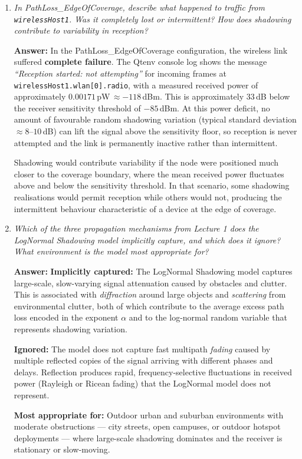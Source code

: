 \documentclass[12pt]{article}
\begin{document}
\begin{enumerate}
    \item \textit{In PathLoss\_EdgeOfCoverage, describe what happened to traffic
          from \texttt{wirelessHost1}. Was it completely lost or intermittent? How
          does shadowing contribute to variability in reception?}

    \textbf{Answer:}
    In the PathLoss\_EdgeOfCoverage configuration, the wireless link suffered
    \textbf{complete failure}. The Qtenv console log shows the message
    \textit{``Reception started: not attempting''} for incoming frames at
    \texttt{wirelessHost1.wlan[0].radio}, with a measured received power of
    approximately $0.00171$\,pW\,$\approx -118$\,dBm. This is approximately
    33\,dB below the receiver sensitivity threshold of $-85$\,dBm. At this
    power deficit, no amount of favourable random shadowing variation (typical
    standard deviation $\approx 8$--$10$\,dB) can lift the signal above the
    sensitivity floor, so reception is never attempted and the link is
    permanently inactive rather than intermittent.

    Shadowing would contribute variability if the node were positioned much
    closer to the coverage boundary, where the mean received power fluctuates
    above and below the sensitivity threshold. In that scenario, some
    shadowing realisations would permit reception while others would not,
    producing the intermittent behaviour characteristic of a device at the
    edge of coverage.

    \item \textit{Which of the three propagation mechanisms from Lecture 1 does
          the LogNormal Shadowing model implicitly capture, and which does it
          ignore? What environment is the model most appropriate for?}

    \textbf{Answer:}
    \textbf{Implicitly captured:} The LogNormal Shadowing model captures
    large-scale, slow-varying signal attenuation caused by obstacles and clutter.
    This is associated with \textit{diffraction} around large objects and
    \textit{scattering} from environmental clutter, both of which contribute to
    the average excess path loss encoded in the exponent $\alpha$ and to the
    log-normal random variable that represents shadowing variation.

    \textbf{Ignored:} The model does not capture fast multipath \textit{fading}
    caused by multiple reflected copies of the signal arriving with different
    phases and delays. Reflection produces rapid, frequency-selective fluctuations
    in received power (Rayleigh or Ricean fading) that the LogNormal model does
    not represent.

    \textbf{Most appropriate for:} Outdoor urban and suburban environments with
    moderate obstructions --- city streets, open campuses, or outdoor hotspot
    deployments --- where large-scale shadowing dominates and the receiver is
    stationary or slow-moving.

\end{enumerate}
\end{document}
